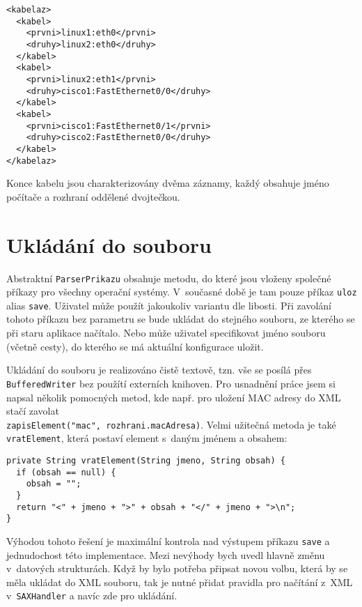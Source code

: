 \begin{verbatim}
<kabelaz>
  <kabel>
    <prvni>linux1:eth0</prvni>
    <druhy>linux2:eth0</druhy>
  </kabel>
  <kabel>
    <prvni>linux2:eth1</prvni>
    <druhy>cisco1:FastEthernet0/0</druhy>
  </kabel>
  <kabel>
    <prvni>cisco1:FastEthernet0/1</prvni>
    <druhy>cisco2:FastEthernet0/0</druhy>
  </kabel>
</kabelaz>
\end{verbatim} 

Konce kabelu jsou charakterizovány dvěma záznamy, každý obsahuje jméno počítače a rozhraní oddělené dvojtečkou.


\section{Ukládání do souboru}
Abstraktní \verb|ParserPrikazu| obsahuje metodu, do které jsou vloženy společné příkazy pro všechny operační systémy. V~současné době je tam pouze příkaz \verb|uloz| alias \verb|save|. Uživatel může použít jakoukoliv variantu dle libosti. Při zavolání tohoto příkazu bez parametru se bude ukládat do stejného souboru, ze kterého se při staru aplikace načítalo. Nebo může uživatel specifikovat jméno souboru (včetně cesty), do kterého se má aktuální konfigurace uložit. 

Ukládání do souboru je realizováno čistě textově, tzn. vše se posílá přes \verb|BufferedWriter| bez použítí externích knihoven. Pro usnadnění práce jsem si napsal několik pomocných metod, kde např. pro uložení MAC adresy do XML stačí zavolat \\\verb|zapisElement("mac", rozhrani.macAdresa)|. Velmi užitečná metoda je také \verb|vratElement|, která postaví element s~daným jménem a obsahem:
\begin{verbatim}
private String vratElement(String jmeno, String obsah) {
  if (obsah == null) {
    obsah = "";
  }
  return "<" + jmeno + ">" + obsah + "</" + jmeno + ">\n";
}
\end{verbatim} 


Výhodou tohoto řešení je maximální kontrola nad výstupem příkazu \verb|save| a jednudochost této implementace. Mezi nevýhody bych uvedl hlavně změnu v~datových strukturách. Když by bylo potřeba připsat novou volbu, která by se měla ukládat do XML souboru, tak je nutné přidat pravidla pro načítání z~XML v~\verb|SAXHandler| a navíc zde pro ukládání.





